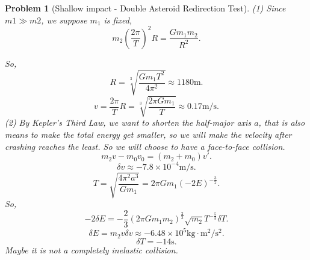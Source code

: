 \documentclass{article}
\theoremstyle{1}
\newtheorem{problem}{Problem}
\begin{document}
\begin{problem}[Shallow impact - Double Asteroid Redirection Test]
    (1) Since $m1\gg m2$, we suppose $m_1$ is fixed,
    \begin{equation}
        m_2\left(\frac{2\pi}{T}\right)^2R=\frac{Gm_1m_2}{R^2}.
    \end{equation}
    
    So,
    \begin{equation}
        R=\sqrt[3]{\frac{Gm_1T^2}{4\pi^2}}\approx 1180  \mathrm{m}.
    \end{equation}
    \begin{equation}
        v=\frac{2\pi}{T}R=\sqrt[3]{\frac{2\pi Gm_1}{T}}\approx 0.17\mathrm{m/s}.
    \end{equation}
    (2) By Kepler's Third Law, we want to shorten the half-major axis $a$, that is also means to make the total energy get smaller, so we will make the velocity after crashing reaches the least. So we will choose to have a face-to-face collision.
    \begin{equation}
        m_2v-m_0v_0=(m_2+m_0)v'.
    \end{equation}
    \begin{equation}
        \delta v\approx-7.8\times 10^{-4}\mathrm{m/s}.
    \end{equation}
    \begin{equation}
        T=\sqrt{\frac{4\pi^2a^3}{Gm_1}}=2\pi Gm_1\left(-2E\right)^{-\frac{3}{2}}.
    \end{equation}
    So, 
    \begin{equation}
        -2\delta E=-\frac{2}{3}(2\pi Gm_1m_2)^{\frac{2}{3}}\sqrt{m_2}T^{-\frac{5}{3}}\delta T.
    \end{equation}
    \begin{equation}
        \delta E=m_2v\delta v\approx -6.48\times 10^{5}\mathrm{kg\cdot m^2/s^2 }.
    \end{equation}
    \begin{equation}
        \delta T=-14\mathrm{s}.
    \end{equation}
    Maybe it is not a completely inelastic collision.
\end{problem}
\end{document}
